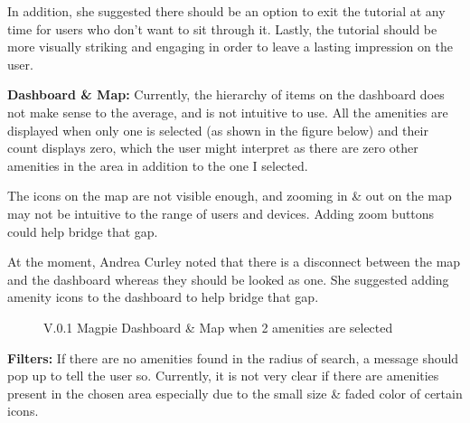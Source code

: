 In addition, she suggested there should be an option to exit the tutorial at any
time for users who don't want to sit through it. Lastly, the tutorial should be
more visually striking and engaging in order to leave a lasting impression on
the user.

\textbf{Dashboard \& Map: }
Currently, the hierarchy of items on the dashboard does not make sense to the
average, and is not intuitive to use. All the amenities are displayed when only
one is selected (as shown in the figure below) and their count displays zero,
which the user might interpret as there are zero other amenities in the area in
addition to the one I selected.

The icons on the map are not visible enough, and zooming in \& out on the map
may not be intuitive to the range of users and devices. Adding zoom buttons
could help bridge that gap.

At the moment, Andrea Curley noted that there is a disconnect between the map
and the dashboard whereas they should be looked as one. She suggested adding
amenity icons to the dashboard to help bridge that gap.
\begin{figure}[h!]
    \centering
    \caption{V.0.1 Magpie Dashboard \& Map when 2 amenities are selected}
\end{figure}

\textbf{Filters: }
If there are no amenities found in the radius of search, a message should pop up
to tell the user so. Currently, it is not very clear if there are amenities
present in the chosen area especially due to the small size \& faded color of
certain icons.

